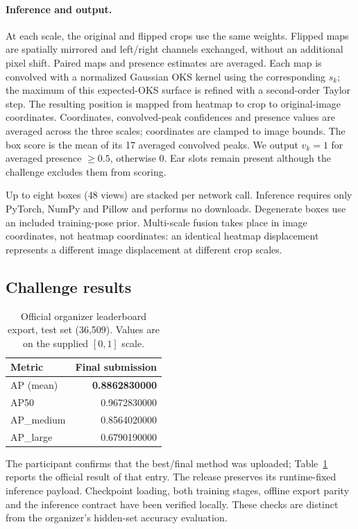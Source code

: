 \documentclass[a4paper,10pt,conference]{ieeeconf}
\begin{document}
\paragraph{Inference and output.}
At each scale, the original and flipped crops use the same weights. Flipped maps are spatially mirrored and left/right channels exchanged, without an additional pixel shift. Paired maps and presence estimates are averaged. Each map is convolved with a normalized Gaussian OKS kernel using the corresponding $s_k$; the maximum of this expected-OKS surface is refined with a second-order Taylor step. The resulting position is mapped from heatmap to crop to original-image coordinates. Coordinates, convolved-peak confidences and presence values are averaged across the three scales; coordinates are clamped to image bounds. The box score is the mean of its 17 averaged convolved peaks. We output $v_k=1$ for averaged presence $\geq0.5$, otherwise 0. Ear slots remain present although the challenge excludes them from scoring.

Up to eight boxes (48 views) are stacked per network call. Inference requires only PyTorch, NumPy and Pillow and performs no downloads. Degenerate boxes use an included training-pose prior. Multi-scale fusion takes place in image coordinates, not heatmap coordinates: an identical heatmap displacement represents a different image displacement at different crop scales.

\subsection{Challenge results}
\begin{table}[ht]
\centering
\caption{Official organizer leaderboard export, test set (36,509). Values are on the supplied $[0,1]$ scale.}
\begin{tabular}{lr}\hline
Metric & Final submission\\\hline
AP (mean) & \textbf{0.8862830000}\\
AP50 & 0.9672830000\\
AP\_medium & 0.8564020000\\
AP\_large & 0.6790190000\\\hline
\end{tabular}
\label{tab:results}
\end{table}
The participant confirms that the best/final method was uploaded; Table~\ref{tab:results} reports the official result of that entry. The release preserves its runtime-fixed inference payload. Checkpoint loading, both training stages, offline export parity and the inference contract have been verified locally. These checks are distinct from the organizer's hidden-set accuracy evaluation.
\end{document}
